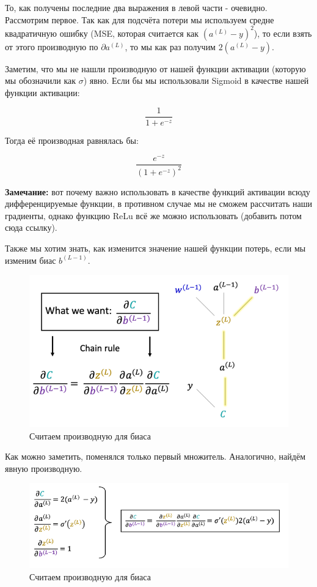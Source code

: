 \documentclass[a4paper, 10pt, openany]{book} %
\begin{document}
	То, как получены последние два выражения в левой части - очевидно. Рассмотрим первое. Так как для подсчёта потери мы используем средне квадратичную ошибку (MSE, которая считается как $(a^{(L)}-y)^2$), то если взять от этого производную по $\partial a^{(L)}$, то мы как раз получим $2(a^{(L)}-y)$.
	
	Заметим, что мы не нашли производную от нашей функции активации (которую мы обозначили как $\sigma$) явно. Если бы мы использовали Sigmoid в качестве нашей функции активации:
	
	\[\dfrac{1}{1+e^{-z}}\]
	
	Тогда её производная равнялась бы:
	
	\[\dfrac{e^{-z}}{(1+e^{-z})^2}\]
	
	\textbf{Замечание:} вот почему важно использовать в качестве функций активации всюду дифференцируемые функции, в противном случае мы не сможем рассчитать наши градиенты, однако функцию ReLu всё же можно использовать (добавить потом сюда ссылку).
	
	Также мы хотим знать, как изменится значение нашей функции потерь, если мы изменим биас $b^{(L-1)}$.
	
	\begin{figure}[h!]
		\centering
		\includegraphics[width=\linewidth]{pictures/backpropagation/bias.png}
		\caption{Считаем производную для биаса}
		\label{derivative_bias}
	\end{figure}
	
	Как можно заметить, поменялся только первый множитель. Аналогично, найдём явную производную.
	
	\begin{figure}[h!]
		\centering
		\includegraphics[width=\linewidth]{pictures/backpropagation/derivative_itself_bias.png}
		\caption{Считаем производную для биаса}
		\label{derivative_itself_bias}
	\end{figure}
\end{document}
